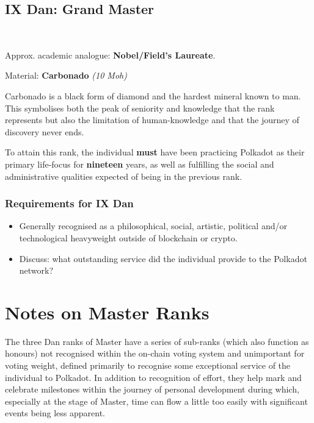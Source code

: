 \documentclass[9pt,oneside]{amsart}
\begin{document}
\subsection{IX Dan: Grand Master}\label{ix-dan-grand-master}~\\


Approx. academic analogue: \textbf{Nobel/Field's Laureate}.

Material: \textbf{Carbonado} \emph{(10 Moh)}

Carbonado is a black form of diamond and the hardest mineral known to man. This symbolises both the peak of seniority and knowledge that the rank represents but also the limitation of human-knowledge and that the journey of discovery never ends.

To attain this rank, the individual \textbf{must} have been practicing Polkadot as their primary life-focus for \textbf{nineteen} years, as well as fulfilling the social and administrative qualities expected of being in the previous rank.

\subsubsection{Requirements for IX Dan}\label{requirements-9}

\begin{itemize}
\item Generally recognised as a philosophical, social, artistic, political and/or technological heavyweight outside of blockchain or crypto.
\item Discuss: what outstanding service did the individual provide to the Polkadot network?
\end{itemize}

\section{Notes on Master Ranks}\label{notes-on-master-ranks}

The three Dan ranks of Master have a series of sub-ranks (which also function as honours) not recognised within the on-chain voting system and unimportant for voting weight, defined primarily to recognise some exceptional service of the individual to Polkadot. In addition to recognition of effort, they help mark and celebrate milestones within the journey of personal development during which, especially at the stage of Master, time can flow a little too easily with significant events being less apparent.
\end{document}
